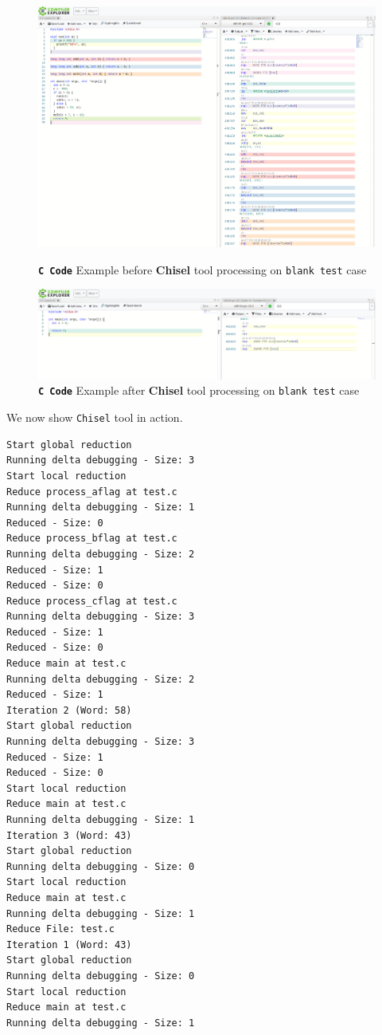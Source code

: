 \documentclass{relatorio}
\begin{document}
\begin{figure}
	\centering
	\captionsetup{justification=centering}
	\includegraphics[width=1\linewidth]{imgs/chisel_before.png}
	\caption{\textbf{\texttt{C Code}} Example \color{red} before \color{black} \textbf{Chisel} tool processing on \texttt{blank test} case}%
	\label{fig:plant}
	\centering
	\captionsetup{justification=centering}
	\includegraphics[width=1\linewidth]{imgs/chisel_after.png}
	\caption{\textbf{\texttt{C Code}} Example \color{green} after \color{black} \textbf{Chisel} tool processing on \texttt{blank test} case}%
	\label{fig:plant}
\end{figure}

We now show \texttt{Chisel} tool in action.
 
\begin{lstlisting}
Start global reduction
Running delta debugging - Size: 3
Start local reduction
Reduce process_aflag at test.c
Running delta debugging - Size: 1
Reduced - Size: 0
Reduce process_bflag at test.c
Running delta debugging - Size: 2
Reduced - Size: 1
Reduced - Size: 0
Reduce process_cflag at test.c
Running delta debugging - Size: 3
Reduced - Size: 1
Reduced - Size: 0
Reduce main at test.c
Running delta debugging - Size: 2
Reduced - Size: 1
Iteration 2 (Word: 58)
Start global reduction
Running delta debugging - Size: 3
Reduced - Size: 1
Reduced - Size: 0
Start local reduction
Reduce main at test.c
Running delta debugging - Size: 1
Iteration 3 (Word: 43)
Start global reduction
Running delta debugging - Size: 0
Start local reduction
Reduce main at test.c
Running delta debugging - Size: 1
Reduce File: test.c
Iteration 1 (Word: 43)
Start global reduction
Running delta debugging - Size: 0
Start local reduction
Reduce main at test.c
Running delta debugging - Size: 1
\end{lstlisting}
\end{document}
